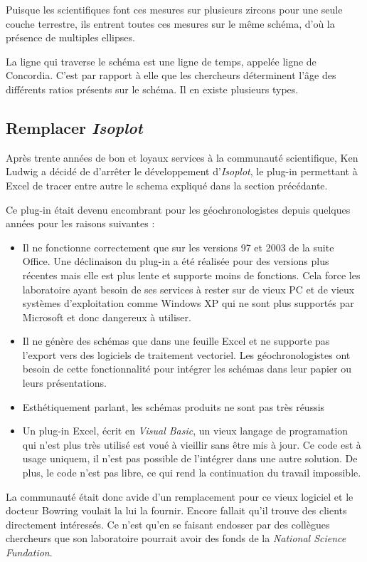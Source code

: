 Puisque les scientifiques font ces mesures sur plusieurs zircons pour une seule couche terrestre, ils entrent toutes ces mesures sur le même schéma, d'où la présence de multiples ellipses.

La ligne qui traverse le schéma est une ligne de temps, appelée ligne de Concordia. C'est par rapport à elle que les chercheurs déterminent l'âge des différents ratios présents sur le schéma. Il en existe plusieurs types.

\subsection{Remplacer \textit{Isoplot}}
Après trente années de bon et loyaux services à la communauté scientifique, Ken Ludwig a décidé de d'arrêter le développement d'\textit{Isoplot}, le plug-in permettant à Excel de tracer entre autre le schema expliqué dans la section précédante.

Ce plug-in était devenu encombrant pour les géochronologistes depuis quelques années pour les raisons suivantes :

\begin{itemize}
\item Il ne fonctionne correctement que sur les versions 97 et 2003 de la suite Office. Une déclinaison du plug-in a été réalisée pour des versions plus récentes mais elle est plus lente et supporte moins de fonctions. Cela force les laboratoire ayant besoin de ses services à rester sur de vieux PC et de vieux systèmes d'exploitation comme Windows XP qui ne sont plus supportés par Microsoft et donc dangereux à utiliser.
\item Il ne génère des schémas que dans une feuille Excel et ne supporte pas l'export vers des logiciels de traitement vectoriel. Les géochronologistes ont besoin de cette fonctionnalité pour intégrer les schémas dans leur papier ou leurs présentations.
\item Esthétiquement parlant, les schémas produits ne sont pas très réussis
\item Un plug-in Excel, écrit en \textit{Visual Basic}, un vieux langage de programation qui n'est plus très utilisé est voué à vieillir sans être mis à jour. Ce code est à usage uniquem, il n'est pas possible de l'intégrer dans une autre solution. De plus, le code n'est pas libre, ce qui rend la continuation du travail impossible.
\end{itemize}

La communauté était donc avide d'un remplacement pour ce vieux logiciel et le docteur Bowring voulait la lui la fournir. Encore fallait qu'il trouve des clients directement intéressés. Ce n'est qu'en se faisant endosser par des collègues chercheurs que son laboratoire pourrait avoir des fonds de la \textit{National Science Fundation}.

